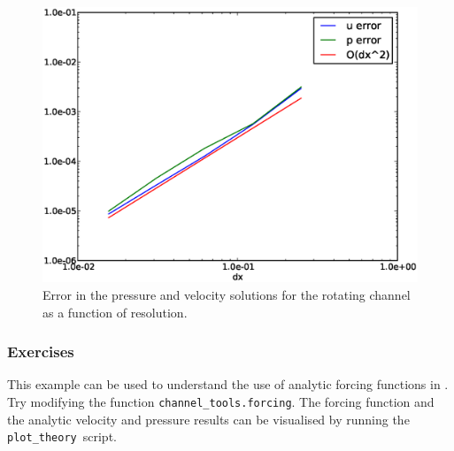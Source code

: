 \begin{figure}[htbp]
  \centering
  \onlypdf{\begin{pdfdisplay}}
    \includegraphics[width=1.1\textwidth]{examples_images/rotating_channel/convergence.eps}
  \onlypdf{\end{pdfdisplay}}  
  \caption{Error in the pressure and velocity solutions for the rotating channel as a function of resolution.}
  \label{fig:periodic_channel_error}
\end{figure}

\subsubsection{Exercises}

This example can be used to understand the use of analytic forcing
functions in \fluidity. Try modifying the function
\lstinline[language=python]{channel_tools.forcing}. The forcing function
and the analytic velocity and pressure results can be visualised by running
the \lstinline[language=python]{plot_theory}\ script. 

